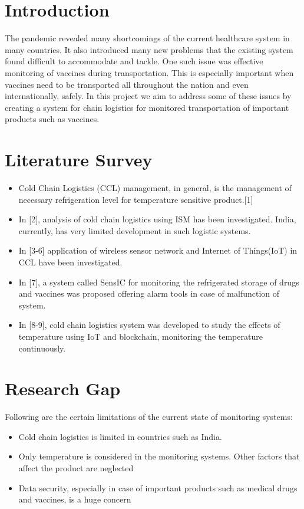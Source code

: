 \section{Introduction}

The pandemic revealed many shortcomings of the current healthcare system in
many countries. It also introduced many new problems that the existing system
found difficult to accommodate and tackle. One such issue was effective
monitoring of vaccines during transportation. This is especially important
when vaccines need to be transported all throughout the nation and even
internationally, safely.
In this project we aim to address some of these issues by creating a system for
chain logistics for monitored transportation of important products such as
vaccines.

\section{Literature Survey}

\begin{itemize}
    \item Cold Chain Logistics (CCL) management, in general, is the management of necessary refrigeration level for temperature sensitive product.[1]
    \item In [2], analysis of cold chain logistics using ISM has been investigated. India, currently, has very limited development in such logistic systems.
    \item In [3-6] application of wireless sensor network and Internet of Things(IoT) in CCL have been investigated.
    \item In [7], a system called SensIC for monitoring the refrigerated storage of drugs and vaccines was proposed offering alarm tools in case of malfunction of system.
    \item In [8-9],  cold chain logistics system was developed to study the effects of temperature using IoT and blockchain, monitoring the temperature continuously.
\end{itemize}




\section{Research Gap}

Following are the certain limitations of the current state of monitoring systems:
\begin{itemize}
    \item  Cold chain logistics is limited  in countries such as India.
    \item Only temperature is considered in the monitoring systems. Other factors that affect the product are neglected
    \item Data security, especially in case of important products such as medical drugs and vaccines, is a huge concern
\end{itemize}

